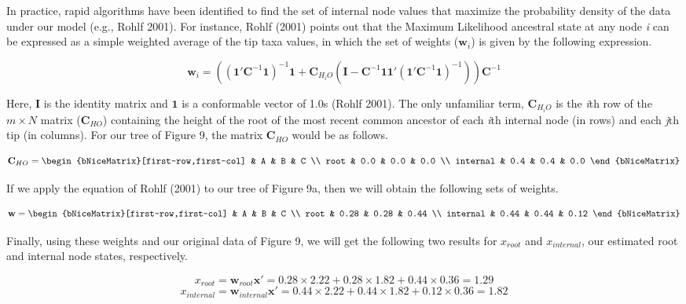 \documentclass{article}
\begin{document}
In practice, rapid algorithms have been identified to find the set of internal node values that maximize the probability density of the data under our model (e.g., Rohlf 2001). For instance, Rohlf (2001) points out that the Maximum Likelihood ancestral state at any node \emph{i} can be expressed as a simple weighted average of the tip taxa values, in which the set of weights (\(\mathbf{w}_i\)) is given by the following expression.

\[
\mathbf{w}_{i} = 
  \left(
    \left(
      \mathbf{1}'\mathbf{C}^{-1}\mathbf{1}
    \right)^{-1}\mathbf{1} + \mathbf{C}_{H_{i}O}
    \left(
      \mathbf{I}-\mathbf{C}^{-1}\mathbf{1}\mathbf{1}'
      \left(
        \mathbf{1}'\mathbf{C}^{-1}\mathbf{1}
      \right)^{-1}
    \right)
  \right)\mathbf{C}^{-1}
\]

Here, \(\mathbf{I}\) is the identity matrix and \(\mathbf{1}\) is a conformable vector of 1.0s (Rohlf 2001). The only unfamiliar term, \(\mathbf{C}_{H_{i}O}\) is the \emph{i}th row of the \(m \times N\) matrix (\(\mathbf{C}_{HO}\)) containing the height of the root of the most recent common ancestor of each \emph{i}th internal node (in rows) and each \emph{j}th tip (in columns). For our tree of Figure 9, the matrix \(\mathbf{C}_{HO}\) would be as follows.

\[
\mathbf{C}_{HO} = 
\begin{bNiceMatrix}[first-row,first-col]
& A & B & C \\
root & 0.0 & 0.0 & 0.0 \\
internal & 0.4 & 0.4 & 0.0
\end{bNiceMatrix}
\]

If we apply the equation of Rohlf (2001) to our tree of Figure 9a, then we will obtain the following sets of weights.

\[
\mathbf{w} = 
\begin{bNiceMatrix}[first-row,first-col]
& A & B & C \\
root & 0.28 & 0.28 & 0.44 \\
internal & 0.44 & 0.44 & 0.12
\end{bNiceMatrix}
\]

Finally, using these weights and our original data of Figure 9, we will get the following two results for \(x_{root}\) and \(x_{internal}\), our estimated root and internal node states, respectively.

\[
x_{root} = \mathbf{w}_{root}\mathbf{x}' = 0.28 \times 2.22 + 0.28 \times 1.82 + 0.44 \times 0.36 = 1.29
\]
\[
x_{internal} = \mathbf{w}_{internal}\mathbf{x}' = 0.44 \times 2.22 + 0.44 \times 1.82 + 0.12 \times 0.36 = 1.82
\]
\end{document}
